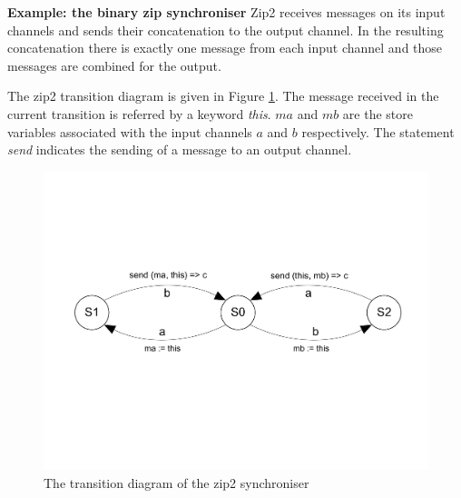 \begin{enumerate}
\textbf{Example: the binary zip synchroniser}  Zip2 receives messages on its input channels and sends their concatenation to the output channel. In the resulting concatenation there is exactly one message from each input channel and those messages are combined for the output.

The zip2 transition diagram is given in Figure \ref{fig:zip2}. The message received in the current transition is referred by a keyword \emph{this}. $ma$ and $mb$ are the store variables associated with the input channels $a$ and $b$ respectively. The statement \emph{send} indicates the sending of a message to an output channel.

  \begin{figure}[here]
  \centering
  \includegraphics[scale=0.4]{figs/zip2.pdf}
  \caption{The transition diagram of the zip2 synchroniser}
  \label{fig:zip2}
  \end{figure}


\end{enumerate}
